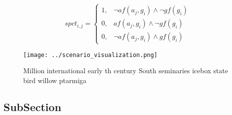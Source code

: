 \documentclass[a4paper]{article}
\begin{document}
\begin{equation}
spct_{i,j} =
\begin{cases}
1, & \text{$\neg af(a_j,g_i) \wedge \neg gf(g_i)$}\\
0, & \text{$af(a_j,g_i) \wedge \neg gf(g_i)$}\\
0, & \text{$\neg af(a_j,g_i) \wedge gf(g_i)$}
\end{cases}
\end{equation}

\begin{figure}
\centering
\texttt{[image: ../scenario\_visualization.png]}
\caption{Million international early th century South seminaries icebox state bird willow ptarmiga
}
\end{figure}
 
\subsection{SubSection}
\end{document}
